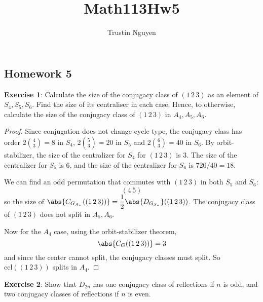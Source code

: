 \documentclass{article}
\title{Math113Hw5}
\author{Trustin Nguyen}
\begin{document}
\maketitle
\reversemarginpar

\begin{topic}
	\section*{Homework 5}
\end{topic}

\textbf{Exercise 1}: Calculate the size of the conjugacy class of $(1 \, 2 \, 3)$ as an element of $S_{4}, S_{5}, S_{6}$. Find the size of its centraliser in each case. Hence, to otherwise, calculate the size of the conjugacy class of $(1 \, 2\, 3)$ in $A_{4}, A_{5}, A_{6}$.

\begin{proof}
	Since conjugation does not change cycle type, the conjugacy class has order $2\binom{4}{3} = 8$ in $S_{4}$, $2\binom{5}{3} = 20$ in $S_{5}$ and $2\binom{6}{3} = 40$ in $S_{6}$. By orbit-stabilizer, the size of the centralizer for $S_{4}$ for $(1 \, 2 \, 3)$ is 3. The size of the centralizer for $S_{5}$ is 6, and the size of the centralizer for $S_{6}$ is $720/40 = 18$.

	We can find an odd permutation that commutes with $(1 \, 2\, 3)$ in both $S_{5}$ and $S_{6}$:
	\begin{equation*}
		(4 \, 5)
	\end{equation*}
	so the size of $\abs{C_{G_{A_{n}}}((1 \, 2 \, 3))} = \dfrac{1}{2}\abs{D_{G_{S_{n}}}}((1 \, 2 \, 3))$. The conjugacy class of $(1 \, 2 \, 3)$ does not split in $A_{5}, A_{6}$.

	Now for the $A_{4}$ case, using the orbit-stabilizer theorem,
	\begin{equation*}
		\abs{C_{G}((1 \,2 \, 3))} = 3
	\end{equation*}
	and since the center cannot split, the conjugacy classes must split. So $\text{ccl}((1 \, 2 \, 3))$ splits in $A_{4}$.
\end{proof}

\textbf{Exercise 2}: Show that $D_{2n}$ has one conjugacy class of reflections if $n$ is odd, and two conjugacy classes of reflections if $n$ is even.
\end{document}
